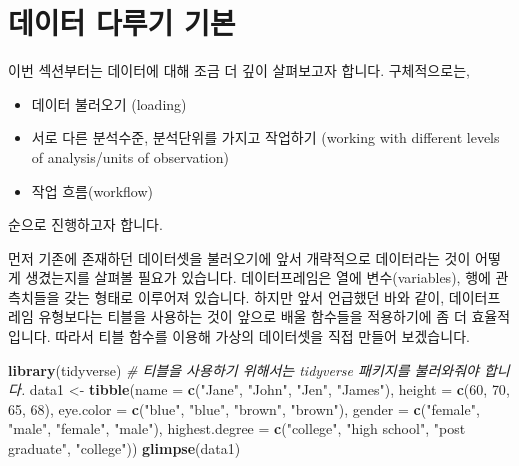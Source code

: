 \documentclass[]{book}
\newenvironment{Shaded}{\begin{snugshade}}{\end{snugshade}}
\newcommand{\CommentTok}[1]{\textcolor[rgb]{0.56,0.35,0.01}{\textit{#1}}}
\newcommand{\DataTypeTok}[1]{\textcolor[rgb]{0.13,0.29,0.53}{#1}}
\newcommand{\DecValTok}[1]{\textcolor[rgb]{0.00,0.00,0.81}{#1}}
\newcommand{\KeywordTok}[1]{\textcolor[rgb]{0.13,0.29,0.53}{\textbf{#1}}}
\newcommand{\NormalTok}[1]{#1}
\newcommand{\StringTok}[1]{\textcolor[rgb]{0.31,0.60,0.02}{#1}}
\providecommand{\tightlist}{%
  \setlength{\itemsep}{0pt}\setlength{\parskip}{0pt}}
\begin{document}
\hypertarget{uxb370uxc774uxd130-uxb2e4uxb8e8uxae30-uxae30uxbcf8}{%
\section{데이터 다루기 기본}\label{uxb370uxc774uxd130-uxb2e4uxb8e8uxae30-uxae30uxbcf8}}

이번 섹션부터는 데이터에 대해 조금 더 깊이 살펴보고자 합니다. 구체적으로는,

\begin{itemize}
\tightlist
\item
  데이터 불러오기 (loading)
\item
  서로 다른 분석수준, 분석단위를 가지고 작업하기 (working with different levels of analysis/units of observation)
\item
  작업 흐름(workflow)
\end{itemize}

순으로 진행하고자 합니다.

먼저 기존에 존재하던 데이터셋을 불러오기에 앞서 개략적으로 데이터라는 것이 어떻게 생겼는지를 살펴볼 필요가 있습니다. 데이터프레임은 열에 변수(variables), 행에 관측치들을 갖는 형태로 이루어져 있습니다. 하지만 앞서 언급했던 바와 같이, 데이터프레임 유형보다는 티블을 사용하는 것이 앞으로 배울 함수들을 적용하기에 좀 더 효율적입니다. 따라서 티블 함수를 이용해 가상의 데이터셋을 직접 만들어 보겠습니다.

\begin{Shaded}
\begin{Highlighting}[]
\KeywordTok{library}\NormalTok{(tidyverse) }\CommentTok{# 티블을 사용하기 위해서는 tidyverse 패키지를 불러와줘야 합니다.}
\NormalTok{data1 <-}\StringTok{ }\KeywordTok{tibble}\NormalTok{(}\DataTypeTok{name =} \KeywordTok{c}\NormalTok{(}\StringTok{"Jane"}\NormalTok{, }\StringTok{"John"}\NormalTok{, }\StringTok{"Jen"}\NormalTok{, }\StringTok{"James"}\NormalTok{),}
                \DataTypeTok{height =} \KeywordTok{c}\NormalTok{(}\DecValTok{60}\NormalTok{, }\DecValTok{70}\NormalTok{, }\DecValTok{65}\NormalTok{, }\DecValTok{68}\NormalTok{),}
                \DataTypeTok{eye.color =} \KeywordTok{c}\NormalTok{(}\StringTok{"blue"}\NormalTok{, }\StringTok{"blue"}\NormalTok{, }\StringTok{"brown"}\NormalTok{, }\StringTok{"brown"}\NormalTok{),}
                \DataTypeTok{gender =} \KeywordTok{c}\NormalTok{(}\StringTok{"female"}\NormalTok{, }\StringTok{"male"}\NormalTok{, }\StringTok{"female"}\NormalTok{, }\StringTok{"male"}\NormalTok{),}
                \DataTypeTok{highest.degree =} \KeywordTok{c}\NormalTok{(}\StringTok{"college"}\NormalTok{, }
                                   \StringTok{"high school"}\NormalTok{, }
                                   \StringTok{"post graduate"}\NormalTok{, }
                                   \StringTok{"college"}\NormalTok{))}
\KeywordTok{glimpse}\NormalTok{(data1)}
\end{Highlighting}
\end{Shaded}
\end{document}

